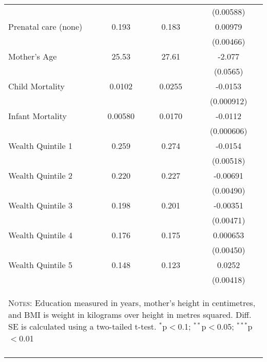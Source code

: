 \begin{table}[htbp]
\begin{tabular}{l*{1}{ccc}}
                    &            &            &   (0.00588)         \\
Prenatal care (none)&       0.193&       0.183&     0.00979\sym{*}  \\
                    &            &            &   (0.00466)         \\
Mother's Age        &       25.53&       27.61&      -2.077\sym{***}\\
                    &            &            &    (0.0565)         \\
Child Mortality     &      0.0102&      0.0255&     -0.0153\sym{***}\\
                    &            &            &  (0.000912)         \\
Infant Mortality    &     0.00580&      0.0170&     -0.0112\sym{***}\\
                    &            &            &  (0.000606)         \\
Wealth Quintile 1   &       0.259&       0.274&     -0.0154\sym{**} \\
                    &            &            &   (0.00518)         \\
Wealth Quintile 2   &       0.220&       0.227&    -0.00691         \\
                    &            &            &   (0.00490)         \\
Wealth Quintile 3   &       0.198&       0.201&    -0.00351         \\
                    &            &            &   (0.00471)         \\
Wealth Quintile 4   &       0.176&       0.175&    0.000653         \\
                    &            &            &   (0.00450)         \\
Wealth Quintile 5   &       0.148&       0.123&      0.0252\sym{***}\\
                    &            &            &   (0.00418)         \\
\midrule\midrule


\multicolumn{4}{p{10.4cm}}{\begin{footnotesize}\textsc{Notes:} Education measured in years, mother's height in centimetres, and BMI is weight in kilograms over height in metres squared.  Diff. SE is calculated using a two-tailed t-test. $^{*}$p$<$0.1; $^{**}$p$<$0.05; $^{***}$p$<$0.01\end{footnotesize}}
\\\bottomrule\normalsize\end{tabular}\end{table} 
